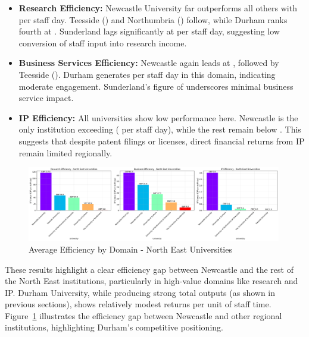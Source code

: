 \documentclass[journal,onecolumn, 10pt,draftclsnofoot]{IEEEtran}
\begin{document}
\begin{itemize}
    \item \textbf{Research Efficiency:} Newcastle University far outperforms all others with  per staff day. Teesside () and Northumbria () follow, while Durham ranks fourth at . Sunderland lags significantly at  per staff day, suggesting low conversion of staff input into research income.
    
    \item \textbf{Business Services Efficiency:} Newcastle again leads at , followed by Teesside (). Durham generates  per staff day in this domain, indicating moderate engagement. Sunderland's figure of  underscores minimal business service impact.
    
    \item \textbf{IP Efficiency:} All universities show low performance here. Newcastle is the only institution exceeding  ( per staff day), while the rest remain below . This suggests that despite patent filings or licenses, direct financial returns from IP remain limited regionally.
\end{itemize}



\begin{figure}[h]
\centering
\includegraphics[width=0.99\textwidth]{Fig/figure38.ne_efficiency_comparison.png}
\caption{Average Efficiency by Domain - North East Universities}
\label{fig:ne-efficiency-comparison}
\end{figure}

These results highlight a clear efficiency gap between Newcastle and the rest of the North East institutions, particularly in high-value domains like research and IP. Durham University, while producing strong total outputs (as shown in previous sections), shows relatively modest returns per unit of staff time. Figure~\ref{fig:ne-efficiency-comparison} illustrates the efficiency gap between Newcastle and other regional institutions, highlighting Durham's competitive positioning.
\end{document}
